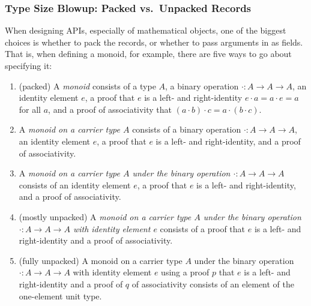 \begin{comment}
Module HList.




Definition vector (n : nat) := {
\end{verbatim}
\end{comment}

\subsubsection{Type Size Blowup: Packed vs.~Unpacked Records} \label{sec:abstraction-barriers:packed-records}
When designing APIs, especially of mathematical objects, one of the biggest choices is whether to pack the records, or whether to pass arguments in as fields.
That is, when defining a monoid, for example, there are five ways to go about specifying it:
\begin{enumerate}
    \item
    (packed)
    A \emph{monoid} consists of a type $A$, a binary operation $\cdot : A \to A \to A$, an identity element $e$, a proof that $e$ is a left- and right-identity $e \cdot a = a \cdot e = a$ for all $a$, and a proof of associativity that $(a \cdot b) \cdot c = a \cdot (b \cdot c)$.
    \item
    A \emph{monoid on a carrier type $A$} consists of a binary operation $\cdot : A \to A \to A$, an identity element $e$, a proof that $e$ is a left- and right-identity, and a proof of associativity.
    \item
    A \emph{monoid on a carrier type $A$ under the binary operation $\cdot : A \to A \to A$} consists of an identity element $e$, a proof that $e$ is a left- and right-identity, and a proof of associativity.
    \item
    (mostly unpacked)
    A \emph{monoid on a carrier type $A$ under the binary operation $\cdot : A \to A \to A$ with identity element $e$} consists of a proof that $e$ is a left- and right-identity and a proof of associativity.
    \item
    (fully unpacked) A monoid on a carrier type $A$ under the binary operation $\cdot : A \to A \to A$ with identity element $e$ using a proof $p$ that $e$ is a left- and right-identity and a proof of $q$ of associativity consists of an element of the one-element unit type.
\end{enumerate}

